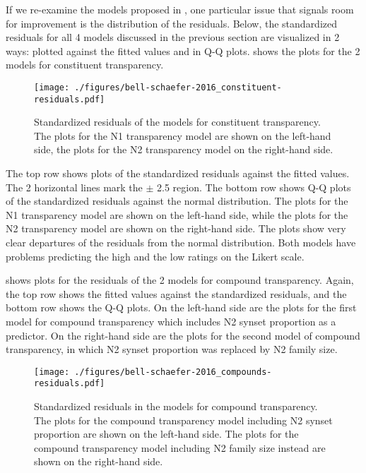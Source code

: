If we re-examine the models proposed in \citet{BellandSchaefer:2016},
one particular issue that signals room for improvement is the
distribution of the residuals. 
Below, the standardized residuals for all 4 models discussed in the previous section are visualized in 2 ways: plotted against the fitted
values and in Q-Q plots.
shows the plots for the 2 models for constituent transparency. 

\begin{figure}[!htb]
  \centering
\texttt{[image: ./figures/bell-schaefer-2016\_constituent-residuals.pdf]}
  \caption{Standardized residuals of the models for constituent transparency. The plots for
the N1 transparency model are shown on the left-hand side, the
plots for the N2 transparency model on the right-hand
side.}
\label{fig:bellschaefer2016_model_constituent_residuals}
\end{figure}

\pagebreak[4]
The top row shows plots of the standardized residuals against the
fitted values. The 2 horizontal lines mark the $\pm$ 2.5 region. The bottom row shows Q-Q plots of the
standardized residuals against the normal distribution. The plots for
the N1 transparency model are shown on the left-hand side, while the
plots for the N2 transparency model are shown on the right-hand
side. The plots show very clear departures of the residuals
from the normal distribution. Both models have problems predicting the
high and the low ratings on the Likert scale. 

\pagebreak[4]
shows plots for the residuals of the 2 models for compound
transparency. Again, the top row shows the fitted values against the
standardized residuals, and the bottom row shows the Q-Q plots. On the
left-hand side are the plots for the first model for compound
transparency which includes N2 synset proportion as a predictor. On
the right-hand side are the plots for the second model of compound
transparency, in which N2 synset proportion was replaced by N2 family size.

\begin{figure}[!htb]
  \centering
\texttt{[image: ./figures/bell-schaefer-2016\_compounds-residuals.pdf]}
  \caption{Standardized residuals in the models for compound transparency. The plots for
the compound transparency model including N2 synset proportion are shown on the left-hand side. The
plots for the compound transparency model including N2 family size instead are shown on the right-hand
side.}
\label{fig:bellschaefer2016_model_compound_residuals}
\end{figure}

